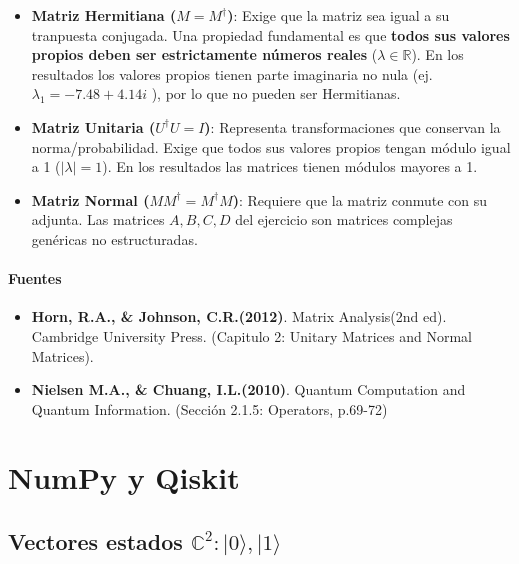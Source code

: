 \documentclass[11pt]{article}
\providecommand{\tightlist}{%
      \setlength{\itemsep}{0pt}\setlength{\parskip}{0pt}}
\begin{document}
\begin{itemize}
\tightlist
\item
  \textbf{Matriz Hermitiana (\(M = M^\dagger\))}: Exige que la matriz
  sea igual a su tranpuesta conjugada. Una propiedad fundamental es que
  \textbf{todos sus valores propios deben ser estrictamente números
  reales} (\(\lambda \in \mathbb{R}\)). En los resultados los valores
  propios tienen parte imaginaria no nula (ej.
  \(\lambda_1 = -7.48 + 4.14i\) ), por lo que no pueden ser Hermitianas.
\item
  \textbf{Matriz Unitaria (\(U^\dagger U = I\))}: Representa
  transformaciones que conservan la norma/probabilidad. Exige que todos
  sus valores propios tengan módulo igual a 1
  (\(\vert\lambda\vert = 1\)). En los resultados las matrices tienen
  módulos mayores a 1.
\item
  \textbf{Matriz Normal (\(M M^\dagger = M^\dagger M\))}: Requiere que
  la matriz conmute con su adjunta. Las matrices \(A,B,C,D\) del
  ejercicio son matrices complejas genéricas no estructuradas.
\end{itemize}

\paragraph{Fuentes}\label{fuentes}

\begin{itemize}
\tightlist
\item
  \textbf{Horn, R.A., \& Johnson, C.R.(2012)}. Matrix Analysis(2nd ed).
  Cambridge University Press. (Capitulo 2: Unitary Matrices and Normal
  Matrices).
\item
  \textbf{Nielsen M.A., \& Chuang, I.L.(2010)}. Quantum Computation and
  Quantum Information. (Sección 2.1.5: Operators, p.69-72)
\end{itemize}

    \section{NumPy y Qiskit}\label{numpy-y-qiskit}

\subsection{\texorpdfstring{Vectores estados
\(\mathbb{C}^2: \vert{0}\rangle, \vert{1}\rangle\)}{Vectores estados \textbackslash mathbb\{C\}\^{}2: \textbackslash vert\{0\}\textbackslash rangle, \textbackslash vert\{1\}\textbackslash rangle}}\label{vectores-estados-mathbbc2-vert0rangle-vert1rangle}
\end{document}
